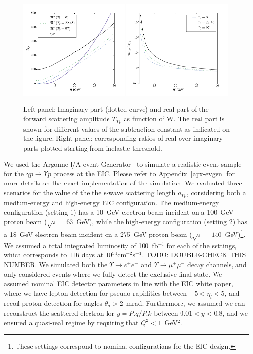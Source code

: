 \documentclass[10pt,prd,aps,nofootinbib,superscriptaddress]{revtex4}
\begin{document}
\begin{figure}[h]
\includegraphics[width=0.49\textwidth]{t_y.pdf}
\includegraphics[width=0.49\textwidth]{reimt_y.pdf}
\caption{Left panel:
Imaginary part (dotted curve) and real part of the forward scattering amplitude $T_{\Upsilon p}$ as function of W.
The real part is shown for different values of the subtraction constant as indicated on the figure.
Right panel: corresponding ratios of real over imaginary parts plotted starting from inelastic threshold.}
\label{fig:psip_psip}
\end{figure}

We used the Argonne l/A-event Generator~\cite{git:lager} to simulate a realistic event sample for the $\gamma p \to \Upsilon p$ process at the EIC.
Please refer to Appendix~\ref{apx-evgen} for more details on the exact implementation of the simulation.
We evaluated three scenarios for the value of the the s-wave scattering length $a_{\Upsilon p}$,
considering both a medium-energy and high-energy EIC configuration.
The medium-energy configuration (setting 1) has a 10~GeV electron beam incident on a 100~GeV proton beam 
($\sqrt{s} = 63$~GeV), while the high-energy configuration (setting 2) has a 18~GeV electron beam incident 
on a 275~GeV proton beam ($\sqrt{s} = 140$~GeV)\footnote{These settings correspond to nominal configurations for the EIC design.}.
We assumed a total integrated luminosity of 100~fb$^{-1}$ for each of the settings, which corresponds to 116 
days at 10$^{34}$cm$^{-2}$s$^{-1}$. {\color{red} TODO: DOUBLE-CHECK THIS NUMBER.} 
We simulated both the $\Upsilon \to e^+e^-$ and $\Upsilon \to \mu^+\mu^-$ decay channels, and only considered events where we fully detect the exclusive final state.
We assumed nominal EIC detector parameters in line with the EIC 
white paper, where we have lepton detection for pseudo-rapidities 
between $-5 < \eta_l < 5$, and recoil proton detection for angles 
$\theta_p > 2$~mrad. 
Furthermore, we assumed we can reconstruct the scattered electron for 
$y = P.q/P.k$ between $0.01 < y < 0.8$, and we ensured a 
quasi-real regime by requiring that $Q^2 < 1$~GeV$^{2}$.
\end{document}

